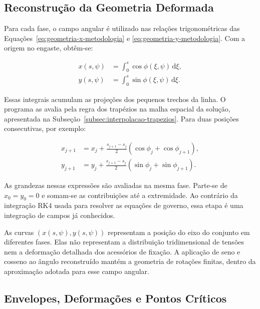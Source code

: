 \documentclass[arial,centeredequations,english,brazilian,oneside,section=TITLE]{ifes8}
\begin{document}
\subsection{Reconstrução da Geometria Deformada}
\label{sec:reconstrucao-geometria-linear}

Para cada fase, o campo angular é utilizado nas relações trigonométricas
das Equações~\eqref{eq:geometria-x-metodologia} e
\eqref{eq:geometria-y-metodologia}. Com a origem no engaste, obtêm-se:

\begin{align}
  x(s,\psi)&=\int_0^s\cos\phi(\xi,\psi)\,\mathrm{d}\xi,
    \label{eq:reconstrucao-coordenada-x}\\
  y(s,\psi)&=\int_0^s\sin\phi(\xi,\psi)\,\mathrm{d}\xi.
    \label{eq:reconstrucao-coordenada-y}
\end{align}

Essas integrais acumulam as projeções dos pequenos trechos da linha. O
programa as avalia pela regra dos trapézios na malha espacial da solução,
apresentada na Subseção~\ref{subsec:interpolacao-trapezios}.
Para duas posições consecutivas, por exemplo:

\begin{align}
  x_{j+1}&=x_j+\frac{s_{j+1}-s_j}{2}
    \left(\cos\phi_j+\cos\phi_{j+1}\right),
    \label{eq:trapezios-geometria-x}\\
  y_{j+1}&=y_j+\frac{s_{j+1}-s_j}{2}
    \left(\sin\phi_j+\sin\phi_{j+1}\right).
    \label{eq:trapezios-geometria-y}
\end{align}

As grandezas nessas expressões são avaliadas na mesma fase. Parte-se de
$x_0=y_0=0$ e somam-se as contribuições até a extremidade. Ao contrário
da integração RK4 usada para resolver as equações de governo, essa etapa
é uma integração de campos já conhecidos.

As curvas $(x(s,\psi),y(s,\psi))$ representam a posição do eixo do conjunto
em diferentes fases. Elas não representam a distribuição tridimensional
de tensões nem a deformação detalhada dos acessórios de fixação. A aplicação
de seno e cosseno ao ângulo reconstruído mantém a geometria de rotações
finitas, dentro da aproximação adotada para esse campo angular.

\subsection{Envelopes, Deformações e Pontos Críticos}
\label{sec:reconstrucao-envelopes-lineares}
\end{document}
